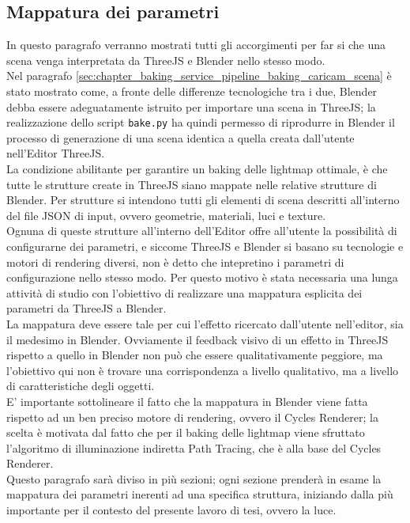 \subsection{Mappatura dei parametri}
\label{sec:chapter_baking_service_pipeline_baking_mapp_parametri}

In questo paragrafo verranno mostrati tutti gli accorgimenti per far si che una scena venga interpretata da ThreeJS e Blender nello stesso modo. 
\\
Nel paragrafo \ref{sec:chapter_baking_service_pipeline_baking_caricam_scena} è stato mostrato come, a fronte delle differenze tecnologiche tra i due, Blender debba essere adeguatamente istruito per importare una scena in ThreeJS;  la realizzazione dello script \texttt{bake.py} ha quindi permesso di riprodurre in Blender il processo di generazione di una scena identica a quella creata dall’utente nell’Editor ThreeJS. 
\\
La condizione abilitante per garantire un baking delle lightmap ottimale, è che tutte le strutture create in ThreeJS siano mappate nelle relative strutture di Blender. Per strutture si intendono tutti gli elementi di scena descritti all’interno del file JSON di input, ovvero geometrie, materiali, luci e texture.
\\ 
Ognuna di queste strutture all’interno dell’Editor offre all’utente la possibilità di configurarne dei parametri, e siccome ThreeJS e Blender si basano su tecnologie e motori di rendering diversi, non è detto che intepretino i parametri di configurazione nello stesso modo. Per questo motivo è stata necessaria una lunga attività di studio con l’obiettivo di realizzare una mappatura esplicita dei parametri da ThreeJS a Blender. 
\\
La mappatura deve essere tale per cui l’effetto ricercato dall’utente nell’editor, sia il medesimo in Blender. Ovviamente il feedback visivo di un effetto in ThreeJS rispetto a quello in Blender non può che essere qualitativamente peggiore, ma l’obiettivo qui non è trovare una corrispondenza a livello qualitativo, ma a livello di caratteristiche degli oggetti. 
\\
E’ importante sottolineare il fatto che la mappatura in Blender viene fatta rispetto ad un ben preciso motore di rendering, ovvero il Cycles Renderer; la scelta è motivata dal fatto che per il baking delle lightmap viene sfruttato l’algoritmo di illuminazione indiretta Path Tracing, che è alla base del Cycles Renderer. 
\\
Questo paragrafo sarà diviso in più sezioni; ogni sezione prenderà in esame la mappatura dei parametri inerenti ad una specifica struttura, iniziando dalla più importante per il contesto del presente lavoro di tesi, ovvero la luce. 
